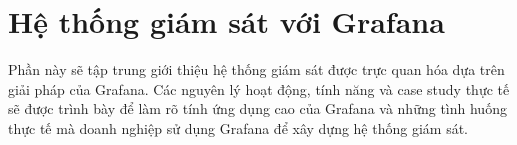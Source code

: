 \chapter{Hệ thống giám sát với Grafana}
Phần này sẽ tập trung giới thiệu hệ thống giám sát được trực quan hóa dựa trên giải pháp của Grafana. Các nguyên lý hoạt động, tính năng và case study thực tế sẽ được trình bày để làm rõ tính ứng dụng cao của Grafana và những tình huống thực tế mà doanh nghiệp sử dụng Grafana để xây dựng hệ thống giám sát.




